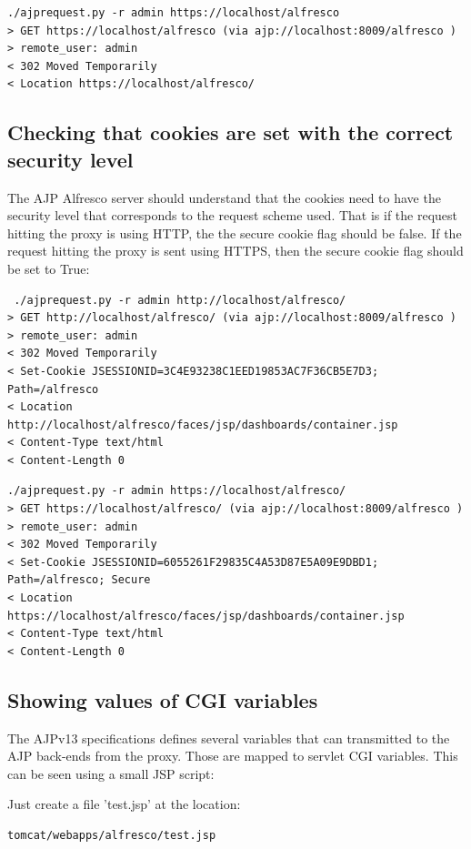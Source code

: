 \documentclass[12pt,a4]{article}
\begin{document}
\begin{verbatim}
./ajprequest.py -r admin https://localhost/alfresco
> GET https://localhost/alfresco (via ajp://localhost:8009/alfresco )
> remote_user: admin
< 302 Moved Temporarily
< Location https://localhost/alfresco/
\end{verbatim}


\subsection{Checking that cookies are set with the correct security level}

The AJP Alfresco server should understand that the cookies need to have the security level that corresponds to the request scheme used. That is if the request hitting the proxy is using HTTP, the the secure cookie flag should be false. If the request hitting the proxy is sent using HTTPS, then the secure cookie flag should be set to True:

\begin{verbatim}
 ./ajprequest.py -r admin http://localhost/alfresco/
> GET http://localhost/alfresco/ (via ajp://localhost:8009/alfresco )
> remote_user: admin
< 302 Moved Temporarily
< Set-Cookie JSESSIONID=3C4E93238C1EED19853AC7F36CB5E7D3; Path=/alfresco
< Location http://localhost/alfresco/faces/jsp/dashboards/container.jsp
< Content-Type text/html
< Content-Length 0
\end{verbatim}


\begin{verbatim}
./ajprequest.py -r admin https://localhost/alfresco/
> GET https://localhost/alfresco/ (via ajp://localhost:8009/alfresco )
> remote_user: admin
< 302 Moved Temporarily
< Set-Cookie JSESSIONID=6055261F29835C4A53D87E5A09E9DBD1; Path=/alfresco; Secure
< Location https://localhost/alfresco/faces/jsp/dashboards/container.jsp
< Content-Type text/html
< Content-Length 0
\end{verbatim}

\subsection{Showing values of CGI variables}
The AJPv13 specifications\cite{ajpv13} defines several variables that can transmitted to the AJP back-ends from the proxy. Those are mapped to servlet CGI variables. This can be seen using a small JSP script:


Just create a file 'test.jsp' at the location:

\begin{verbatim}
tomcat/webapps/alfresco/test.jsp
\end{verbatim}
\end{document}
